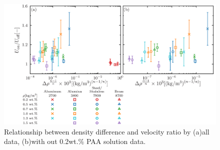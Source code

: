 \begin{figure}[ht]
    \centering
    \includegraphics[width=1.0\textwidth]{./5-Results/density/rhoUdiffAll.png}
    \caption{Relationship between density difference and velocity ratio by (a)all data, (b)with out 0.2wt.\% PAA solution data.}
    \label{fig:rhoUdiffAll}
\end{figure}